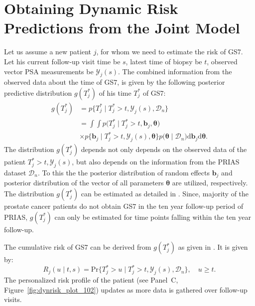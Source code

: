 \section{Obtaining Dynamic Risk Predictions from the Joint Model}
\label{sec:param_estimates_jm_fit_prias}
Let us assume a new patient $j$, for whom we need to estimate the risk of GS7. Let his current follow-up visit time be $s$, latest time of biopsy be $t$, observed vector PSA measurements be $\mathcal{Y}_{j}(s)$. The combined information from the observed data about the time of GS7, is given by the following posterior predictive distribution $g(T^*_j)$ of his time $T^*_j$ of GS7:
\begin{equation*}
\label{eq:post_pred_dist}
\begin{aligned}
g(T^*_j) &= p\big\{T^*_j \mid T^*_j > t, \mathcal{Y}_{j}(s), \mathcal{D}_n\big\}\\
&= \int \int p\big(T^*_j \mid T^*_j > t, \boldsymbol{b}_j, \boldsymbol{\theta}\big)\\
&\times p\big\{\boldsymbol{b}_j \mid T^*_j>t, \mathcal{Y}_{j}(s), \boldsymbol{\theta}\big\}p\big(\boldsymbol{\theta} \mid \mathcal{D}_n\big) \mathrm{d} \boldsymbol{b}_j \mathrm{d} \boldsymbol{\theta}.
\end{aligned}
\end{equation*}
The distribution $g(T^*_j)$ depends not only depends on the observed data of the patient $T^*_j > t, \mathcal{Y}_{j}(s)$, but also depends on the information from the PRIAS dataset $\mathcal{D}_n$. To this the the posterior distribution of random effects $\boldsymbol{b}_j$ and posterior distribution of the vector of all parameters $\boldsymbol{\theta}$ are utilized, respectively. The distribution $g(T^*_j)$ can be estimated as detailed in \citet{rizopoulos2017dynamic}. Since, majority of the prostate cancer patients do not obtain GS7 in the ten year follow-up period of PRIAS, $g(T^*_j)$ can only be estimated for time points falling within the ten year follow-up. 

The cumulative risk of GS7 can be derived from $g(T^*_j)$ as given in \citep{rizopoulos2017dynamic}. It is given by:
\begin{equation}
\label{eq:dynamic_risk_prob}
R_j(u \mid t,s) = \mbox{Pr}\big\{T^*_j > u \mid T^*_j > t, \mathcal{Y}_{j}(s), \mathcal{D}_n\big\}, \quad u \geq t.
\end{equation}
The personalized risk profile of the patient (see Panel~C, Figure~\ref{fig:dynrisk_plot_102}) updates as more data is gathered over follow-up visits. 

